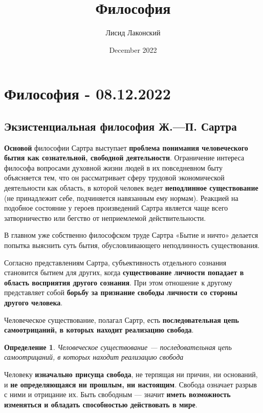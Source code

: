 \documentclass{article}
\title{Философия}
\author{Лисид Лаконский}
\date{December 2022}
\newtheorem{definition}{Определение}
\begin{document}
\maketitle
\tableofcontents
\pagebreak

\section{Философия - 08.12.2022}

\subsection{Экзистенциальная философия Ж.—П. Сартра}

\begin{flushleft}

\textbf{Основой} философии Сартра выступает \textbf{проблема понимания человеческого бытия как сознательной, свободной деятельности}. Ограничение интереса философа вопросами духовной жизни людей в их повседневном быту объясняется тем, что он рассматривает сферу трудовой экономической деятельности как область, в которой человек ведет \textbf{неподлинное существование} (не принадлежит себе, подчиняется навязанным ему нормам). Реакцией на подобное состояние у героев произведений Сартра является чаще всего затворничество или бегство от неприемлемой действительности.

\hfill

В главном уже собственно философском труде Сартра «Бытие и ничто» делается попытка выяснить суть бытия, обусловливающего неподлинность существования.

\hfill

Согласно представлениям Сартра, субъективность отдельного сознания становится бытием для других, когда \textbf{существование личности попадает в область восприятия другого сознания}. При этом отношение к другому представляет собой \textbf{борьбу за признание свободы личности со стороны другого человека}.

\hfill

Человеческое существование, полагал Сартр, есть \textbf{последовательная цепь самоотрицаний, в которых находит реализацию свобода}.

\begin{definition}
    Человеческое существование — последовательная цепь самоотрицаний, в которых находит реализацию свобода
\end{definition}

Человеку \textbf{изначально присуща свобода}, не терпящая ни причин, ни оснований, и \textbf{не определяющаяся ни прошлым, ни настоящим}. Свобода означает разрыв с ними и отрицание их. Быть свободным — значит \textbf{иметь возможность изменяться и обладать способностью действовать в мире}.


\end{flushleft}
\end{document}
